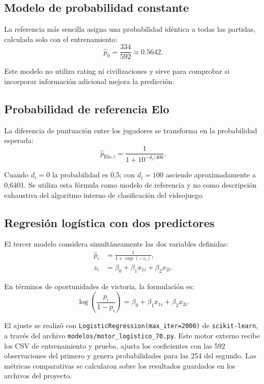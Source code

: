 \documentclass[12pt,a4paper]{article}
\begin{document}
\subsection{Modelo de probabilidad constante}

La referencia más sencilla asigna una probabilidad idéntica a todas las partidas, calculada solo con el entrenamiento:
\begin{equation}
\hat p_{0}=\frac{334}{592}\approx 0.5642.
\end{equation}

Este modelo no utiliza rating ni civilizaciones y sirve para comprobar si incorporar información adicional mejora la predicción.

\subsection{Probabilidad de referencia Elo}

La diferencia de puntuación entre los jugadores se transforma en la probabilidad esperada:
\begin{equation}
\hat p_{\mathrm{Elo},i}=\frac{1}{1+10^{-d_i/400}}.
\end{equation}

Cuando $d_i=0$ la probabilidad es 0,5; con $d_i=100$ asciende aproximadamente a 0,6401. Se utiliza esta fórmula como modelo de referencia y no como descripción exhaustiva del algoritmo interno de clasificación del videojuego.

\subsection{Regresión logística con dos predictores}

El tercer modelo considera simultáneamente las dos variables definidas:
\begin{align}
\hat p_i&=\frac{1}{1+\exp(-z_i)},\\
z_i&=\beta_0+\beta_1x_{1i}+\beta_2x_{2i}.
\end{align}

En términos de oportunidades de victoria, la formulación es:
\begin{equation}
\log\!\left(\frac{p_i}{1-p_i}\right)=\beta_0+\beta_1x_{1i}+\beta_2x_{2i}.
\end{equation}

El ajuste se realizó con \texttt{LogisticRegression(max\_iter=2000)} de \texttt{scikit-learn}, a través del archivo \texttt{modelos/motor\_logistico\_70.py}. Este motor externo recibe los CSV de entrenamiento y prueba, ajusta los coeficientes con las 592 observaciones del primero y genera probabilidades para las 254 del segundo. Las métricas comparativas se calcularon sobre los resultados guardados en los archivos del proyecto.
\end{document}
